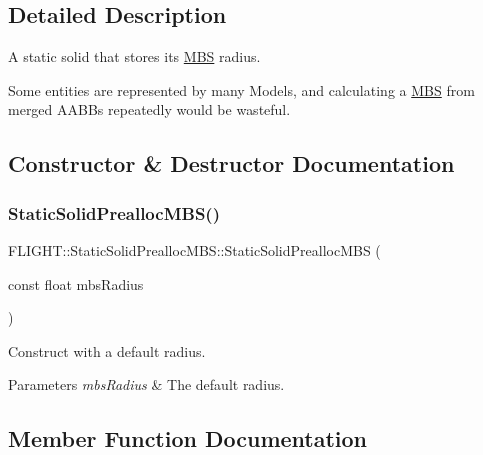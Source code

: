\subsection{Detailed Description}
A static solid that stores it\textquotesingle{}s \hyperlink{class_f_l_i_g_h_t_1_1_m_b_s}{M\+BS} radius. 

Some entities are represented by many Models, and calculating a \hyperlink{class_f_l_i_g_h_t_1_1_m_b_s}{M\+BS} from merged A\+A\+B\+Bs repeatedly would be wasteful. 

\subsection{Constructor \& Destructor Documentation}
\mbox{\label{class_f_l_i_g_h_t_1_1_static_solid_prealloc_m_b_s_ad03a8b9c11e12370d3e21778803fed6e}} 
\subsubsection{\texorpdfstring{Static\+Solid\+Prealloc\+M\+B\+S()}{StaticSolidPreallocMBS()}}
{\footnotesize\ttfamily F\+L\+I\+G\+H\+T\+::\+Static\+Solid\+Prealloc\+M\+B\+S\+::\+Static\+Solid\+Prealloc\+M\+BS (\begin{DoxyParamCaption}\item[{const float}]{mbs\+Radius }\end{DoxyParamCaption})}



Construct with a default radius. 


\begin{DoxyParams}{Parameters}
{\em mbs\+Radius} & The default radius. \\
\hline
\end{DoxyParams}


\subsection{Member Function Documentation}
\mbox{\label{class_f_l_i_g_h_t_1_1_static_solid_prealloc_m_b_s_a3598b87e0be4695f62f526d74e99dc33}} 
